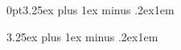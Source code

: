 \titleformat{\paragraph}[runin]
{\normalfont\normalsize\bfseries}{\theparagraph}{1em}{}
\titlespacing*{\paragraph} {0pt}{3.25ex plus 1ex minus .2ex}{1em}

\titleformat{\subparagraph}[runin]
{\normalfont\normalsize\bfseries}{\thesubparagraph}{1em}{}
\titlespacing*{\subparagraph} {\parindent}{3.25ex plus 1ex minus .2ex}{1em}




\setlength{\columnsep}{3pt}
\setlength{\columnseprule}{1pt}
\overfullrule=1mm
